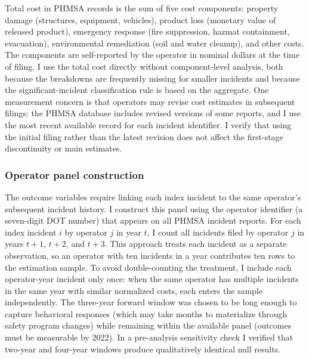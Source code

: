 \documentclass[12pt]{article}
\begin{document}
Total cost in PHMSA records is the sum of five cost components: property damage (structures, equipment, vehicles), product loss (monetary value of released product), emergency response (fire suppression, hazmat containment, evacuation), environmental remediation (soil and water cleanup), and other costs. The components are self-reported by the operator in nominal dollars at the time of filing. I use the total cost directly without component-level analysis, both because the breakdowns are frequently missing for smaller incidents and because the significant-incident classification rule is based on the aggregate. One measurement concern is that operators may revise cost estimates in subsequent filings: the PHMSA database includes revised versions of some reports, and I use the most recent available record for each incident identifier. I verify that using the initial filing rather than the latest revision does not affect the first-stage discontinuity or main estimates.

\subsubsection*{Operator panel construction} The outcome variables require linking each index incident to the same operator's subsequent incident history. I construct this panel using the operator identifier (a seven-digit DOT number) that appears on all PHMSA incident reports. For each index incident $i$ by operator $j$ in year $t$, I count all incidents filed by operator $j$ in years $t+1$, $t+2$, and $t+3$. This approach treats each incident as a separate observation, so an operator with ten incidents in a year contributes ten rows to the estimation sample. To avoid double-counting the treatment, I include each operator-year incident only once: when the same operator has multiple incidents in the same year with similar normalized costs, each enters the sample independently. The three-year forward window was chosen to be long enough to capture behavioral responses (which may take months to materialize through safety program changes) while remaining within the available panel (outcomes must be measurable by 2022). In a pre-analysis sensitivity check I verified that two-year and four-year windows produce qualitatively identical null results.
\end{document}
